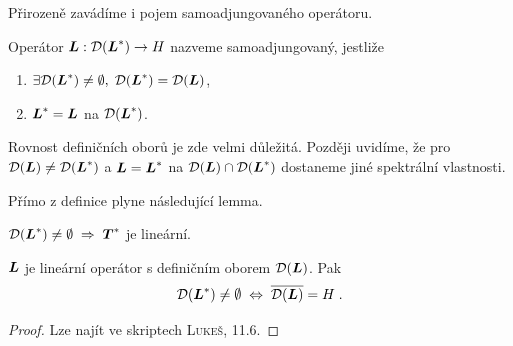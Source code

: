 Přirozeně zavádíme i pojem samoadjungovaného operátoru.

\begin{definition}
Operátor $\boldsymbol{L} : \mathcal{D}(\boldsymbol{L}^*) \to H$ nazveme samoadjungovaný, jestliže \begin{enumerate}
    \item $\exists\mathcal{D}(\boldsymbol{L}^*)\neq\emptyset,\;\mathcal{D}(\boldsymbol{L}^*) = \mathcal{D}(\boldsymbol{L})$,
    \item $\boldsymbol{L}^* = \boldsymbol{L}$ na $\mathcal{D}(\boldsymbol{L}^*)$.
\end{enumerate}
\end{definition}
\begin{remark}
Rovnost definičních oborů je zde velmi důležitá. Později uvidíme, že pro $\mathcal{D}(\boldsymbol{L}) \neq \mathcal{D}(\boldsymbol{L}^*)$ a $\boldsymbol{L} = \boldsymbol{L}^*$ na $\mathcal{D}(\boldsymbol{L}) \cap \mathcal{D}(\boldsymbol{L}^*)$ dostaneme jiné spektrální vlastnosti.
\end{remark}

Přímo z definice plyne následující lemma.
\begin{lemma}
$\mathcal{D}(\boldsymbol{L}^*)\neq\emptyset\;\Rightarrow\; \boldsymbol{T}^*$ je lineární.
\end{lemma}



\begin{theorem}
$\boldsymbol{L}$ je lineární operátor s definičním oborem $\mathcal{D}(\boldsymbol{L})$. Pak $$\mathcal{D}(\boldsymbol{L}^*)\neq\emptyset \;\Leftrightarrow\;\overline{ \mathcal{D}(\boldsymbol{L}) }= H \;.$$
\end{theorem}
\begin{proof}
Lze najít ve skriptech \textsc{Lukeš}, 11.6.
\end{proof}


